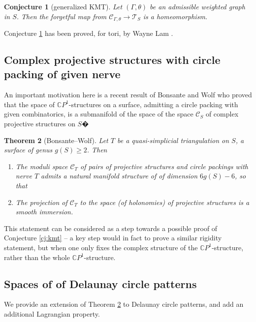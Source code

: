 \documentclass[notitlepage,twoside,a4paper]{amsart}
\newtheorem{theorem}{\rm\bf Theorem}[section]
\newtheorem{conjecture}[theorem]{\rm\bf Conjecture}
\theoremstyle{named}
\newcommand{\CP}{{\mathbb CP}}
\newcommand{\cC}{{\mathcal C}}
\newcommand{\cT}{{\mathcal T}}
\begin{document}
\begin{conjecture}[generalized KMT] \label{cj:kmtg}
  Let $(\Gamma,\theta)$ be an admissible weighted graph in $S$. Then the forgetful map from $\cC_{\Gamma,\theta}\to \cT_S$ is a homeomorphism.
\end{conjecture}

Conjecture \ref{cj:kmtg} has been proved, for tori, by Wayne Lam \cite{lam2019quadratic,lam2024space}.

\subsection{Complex projective structures with circle packing of given nerve}
\label{ssc:circle-packings}

An important motivation here is a recent result of Bonsante and Wolf \cite{bonsante-wolf:projective} who proved that the space of $\CP^1$-structures on a surface, admitting a circle packing with given combinatorics, is a submanifold of the space of the space $\cC_S$ of complex projective structures on $S$�

\begin{theorem}[Bonsante--Wolf] \label{tm:bonsante-wolf}
  Let $T$ be a quasi-simplicial triangulation on $S$, a surface of genus $g(S) \geq 2$. Then
  \begin{enumerate}
  \item The moduli space $\cC_T$ of pairs of projective structures and circle packings with nerve $T$ admits a natural manifold structure of of dimension $6g(S)-6$, so that
  \item The projection of $\cC_T$ to the space (of holonomies) of projective structures is a smooth immersion.
  \end{enumerate}
\end{theorem}

This statement can be considered as a step towards a possible proof of Conjecture \ref{cj:kmt} -- a key step would in fact to prove a similar rigidity statement, but when one only fixes the complex structure of the $\CP^1$-structure, rather than the whole $\CP^1$-structure.

\subsection{Spaces of of Delaunay circle patterns}
\label{ssc:patterns}

We provide an extension of Theorem \ref{tm:bonsante-wolf} to Delaunay circle patterns, and add an additional Lagrangian property.
\end{document}
